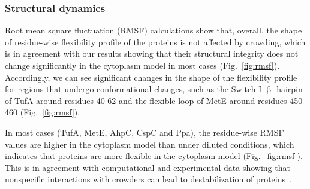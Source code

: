 \documentclass[journal=jpcisd8,manuscript=article]{achemso}
\begin{document}
\subsubsection{Structural dynamics}
  
Root mean square fluctuation (RMSF) calculations show that, overall, the shape of residue-wise flexibility profile of the proteins is not affected by crowding, which is in agreement with our results showing that their structural integrity does not change significantly in the cytoplasm model in most cases (Fig.~\ref{fig:rmsf}). Accordingly, we can see significant changes in the shape of the flexibility profile for regions that undergo conformational changes, such as the Switch I $\upbeta$-hairpin of TufA around residues 40-62 and the flexible loop of MetE around residues 450-460 (Fig.~\ref{fig:rmsf}).

In most cases (TufA, MetE, AhpC, CspC and Ppa), the residue-wise RMSF values are higher in the cytoplasm model than under diluted conditions, which indicates that proteins are more flexible in the cytoplasm model (Fig.~\ref{fig:rmsf}). This is in agreement with computational and experimental data showing that nonspecific interactions with crowders can lead to destabilization of
proteins~\cite{Feig2011, miklos2011, Wang2012b}.
\end{document}
